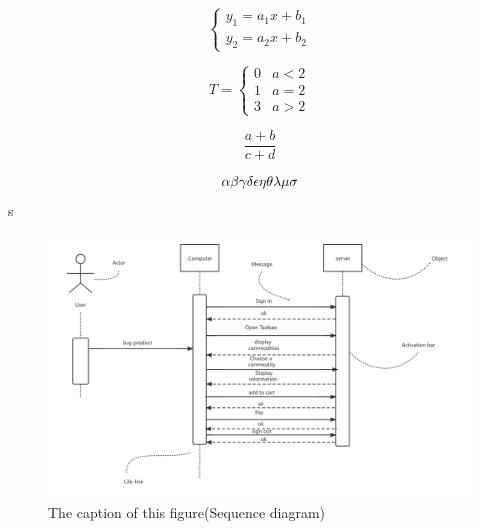 \documentclass[UTF8,a4paper,12pt]{ctexart}
\begin{document}
\begin{equation}
    \left \{
        \begin{gathered}
            y_1 = a_1x + b_1\\
            y_2 = a_2x + b_2
        \end{gathered}
    \right .
\end{equation}

\begin{equation}
    T= 
        \begin{cases}
            0 & a<2\\
            1 & a=2\\
            3 & a>2
        \end{cases}
\end{equation}

\begin{equation} 
    \frac{a+b}{c+d} %
\end{equation}

\begin{equation}
    \alpha\\
    \beta
    \gamma
    \delta
    \epsilon
    \eta
    \theta
    \lambda
    \mu
    \sigma
\end{equation}
 s
\begin{figure}[H] %
\centering %
\includegraphics[width = 12cm]{picture/Sequence diagram.png}
\caption{The caption of this figure(Sequence diagram)}
\end{figure}
\end{document}
